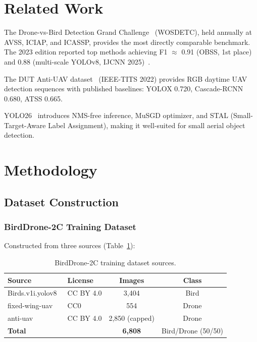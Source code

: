 \documentclass[11pt]{article}
\begin{document}
\section{Related Work}

The Drone-vs-Bird Detection Grand Challenge~\cite{coluccia2023} (WOSDETC),
held annually at AVSS, ICIAP, and ICASSP, provides the most directly comparable
benchmark. The 2023 edition reported top methods achieving F1 $\approx$ 0.91
(OBSS, 1st place) and 0.88 (multi-scale YOLOv8, IJCNN 2025)~\cite{simd3_2025}.

The DUT Anti-UAV dataset~\cite{dutantiuav2022} (IEEE-TITS 2022) provides
RGB daytime UAV detection sequences with published baselines: YOLOX 0.720,
Cascade-RCNN 0.680, ATSS 0.665.

YOLO26~\cite{ultralytics2025} introduces NMS-free inference, MuSGD optimizer,
and STAL (Small-Target-Aware Label Assignment), making it well-suited for
small aerial object detection.

\section{Methodology}

\subsection{Dataset Construction}

\subsubsection{BirdDrone-2C Training Dataset}

Constructed from three sources (Table~\ref{tab:datasets_2c}):

\begin{table}[H]
\centering
\caption{BirdDrone-2C training dataset sources.}
\label{tab:datasets_2c}
\begin{tabular}{llcc}
\toprule
\textbf{Source} & \textbf{License} & \textbf{Images} & \textbf{Class} \\
\midrule
Birds.v1i.yolov8~\cite{birds_roboflow} & CC BY 4.0 & 3,404 & Bird \\
fixed-wing-uav~\cite{fixedwing_kaggle} & CC0 & 554 & Drone \\
anti-uav~\cite{antiuav_roboflow} & CC BY 4.0 & 2,850 (capped) & Drone \\
\midrule
\textbf{Total} & & \textbf{6,808} & Bird/Drone (50/50) \\
\bottomrule
\end{tabular}
\end{table}
\end{document}
